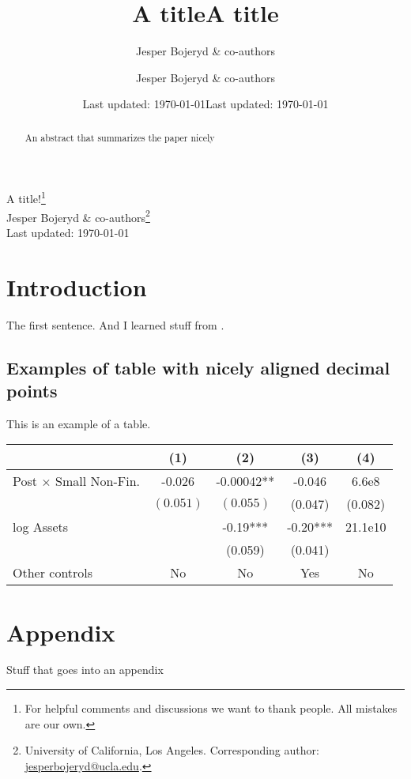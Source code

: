 \documentclass[12pt,letter]{article}
\title{A title}
\date{Last updated: \today}
\author{Jesper Bojeryd \& co-authors}
\title{A title}
\date{Last updated: \today}
\author{Jesper Bojeryd \& co-authors}
\begin{document}
 
\begingroup 
\renewcommand{\thefootnote}{\fnsymbol{footnote}}
  \centering 
  \LARGE A title!\footnote{For helpful comments and discussions we want to thank people. All mistakes are our own.} \\[0.2em]
  \large Jesper Bojeryd \& co-authors\footnote{University of California, Los Angeles. Corresponding author: \url{jesperbojeryd@ucla.edu}.}\\[0.5em]
  Last updated: \today
  \\[1em]\par
\endgroup

\setcounter{footnote}{0}%

\begin{abstract}
    \noindent An abstract that summarizes the paper nicely
\end{abstract}

\section{Introduction}
The first sentence. And I learned stuff from \cite{paper2022}.

\subsection{Examples of table with nicely aligned decimal points}
This is an example of a table.

\begin{table}[h]\centering
{}
    \begin{tabular}{lS[table-format=-1.3]S[table-format=-1.5{**}]S[table-format=-1.2{***}]S[table-format=-2.3e2]}
    \hline
                        & {(1)} & {(2)} & {(3)} & {(4)} \\
    \hline
    {Post $\times$ Small Non-Fin.} & -0.026 & -0.00042** & -0.046 & 6.6e8 \\
                        & {$(0.051)$} & {$(0.055)$} & {(}0.047{) }& {(}0.082{)} \\
    {log Assets} & & -0.19***& -0.20***& 21.1e10\\
                        & & {(}0.059{)} & {(}0.041{)} &%
                        \\
    {Other controls} & {No} & {No} & {Yes} & {No} \\
    \hline
    \end{tabular}
\end{table}





\newpage\clearpage
\appendix 
\setcounter{figure}{0} \renewcommand{\thefigure}{A\arabic{figure}}
\setcounter{table}{0} \renewcommand{\thetable}{A\arabic{table}}

\section*{Appendix}
Stuff that goes into an appendix
\end{document}
